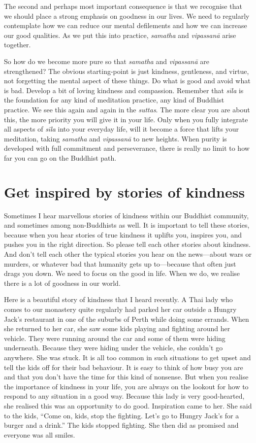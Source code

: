 \documentclass[12pt,openany]{book}
\begin{document}
The second and perhaps most important consequence is that we recognise that we should place a strong emphasis on goodness in our lives. We need to regularly contemplate how we can reduce our mental defilements and how we can increase our good qualities. As we put this into practice, \textit{samatha} and \textit{vipassanā} arise together.

So how do we become more pure so that \textit{samatha} and \textit{vipassanā} are strengthened? The obvious starting-point is just kindness, gentleness, and virtue, not forgetting the mental aspect of these things. Do what is good and avoid what is bad. Develop a bit of loving kindness and compassion. Remember that \textit{sīla} is the foundation for any kind of meditation practice, any kind of Buddhist practice. We see this again and again in the \textit{suttas}. The more clear you are about this, the more priority you will give it in your life. Only when you fully integrate all aspects of \textit{sīla} into your everyday life, will it become a force that lifts your meditation, taking \textit{samatha} and \textit{vipassanā} to new heights. When purity is developed with full commitment and perseverance, there is really no limit to how far you can go on the Buddhist path.

\section*{Get inspired by stories of kindness}

Sometimes I hear marvellous stories of kindness within our Buddhist community, and sometimes among non-Buddhists as well. It is important to tell these stories, because when you hear stories of true kindness it uplifts you, inspires you, and pushes you in the right direction. So please tell each other stories about kindness. And don’t tell each other the typical stories you hear on the news—about wars or murders, or whatever bad that humanity gets up to—because that often just drags you down. We need to focus on the good in life. When we do, we realise there is a lot of goodness in our world.

Here is a beautiful story of kindness that I heard recently. A Thai lady who comes to our monastery quite regularly had parked her car outside a Hungry Jack’s restaurant in one of the suburbs of Perth while doing some errands. When she returned to her car, she saw some kids playing and fighting around her vehicle. They were running around the car and some of them were hiding underneath. Because they were hiding under the vehicle, she couldn’t go anywhere. She was stuck. It is all too common in such situations to get upset and tell the kids off for their bad behaviour. It is easy to think of how busy you are and that you don't have the time for this kind of nonsense. But when you realise the importance of kindness in your life, you are always on the lookout for how to respond to any situation in a good way. Because this lady is very good-hearted, she realised this was an opportunity to do good. Inspiration came to her. She said to the kids, “Come on, kids, stop the fighting. Let’s go to Hungry Jack’s for a burger and a drink.” The kids stopped fighting. She then did as promised and everyone was all smiles.
\end{document}
